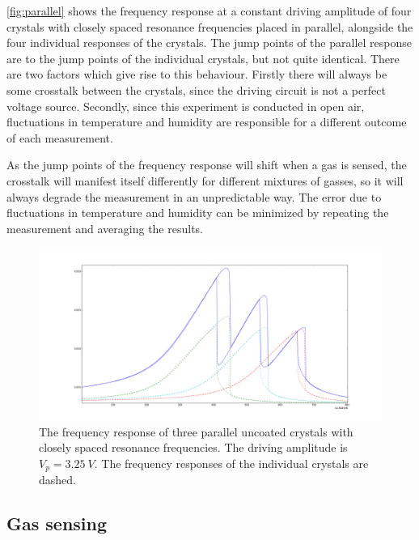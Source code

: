 \autoref{fig:parallel} shows the frequency response at a constant driving amplitude of four crystals with closely spaced resonance frequencies placed in parallel, alongside the four individual responses of the crystals. The jump points of the parallel response are to the jump points of the individual crystals, but not quite identical. There are two factors which give rise to this behaviour. Firstly there will always be some crosstalk between the crystals, since the driving circuit is not a perfect voltage source. Secondly, since this experiment is conducted in open air, fluctuations in temperature and humidity are responsible for a different outcome of each measurement. 

As the jump points of the frequency response will shift when a gas is sensed, the crosstalk will manifest itself differently for different mixtures of gasses, so it will always degrade the measurement in an unpredictable way. The error due to fluctuations in temperature and humidity can be minimized by repeating the measurement and averaging the results. 

\begin{figure}
	\centering
		\includegraphics[width=\textwidth]{figures/parallel.png}
	\caption{The frequency response of three parallel uncoated crystals with closely spaced resonance frequencies. The driving amplitude is $V_p = \SI{3.25}{V}$. The frequency responses of the individual crystals are dashed.}
	\label{fig:parallel}
\end{figure}

\subsection{Gas sensing}


